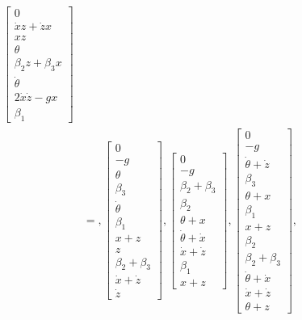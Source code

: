 \documentclass[12pt]{article}
\begin{document}
\begin{align*}
    \left[\begin{matrix}0\\\dot{x} z + \dot{z} x\\x z\\\theta\\\beta_{2} z + \beta_{3} x\\\dot{\theta}\\2 \dot{x} \dot{z} - g x\\\beta_{1}\end{matrix}\right] \\
    &= ,\left[\begin{matrix}0\\- g\\\theta\\\beta_{3}\\\dot{\theta}\\\beta_{1}\\x + z\\z\\\beta_{2} + \beta_{3}\\\dot{x} + \dot{z}\\\dot{z}\end{matrix}\right],
    \left[\begin{matrix}0\\- g\\\beta_{2} + \beta_{3}\\\beta_{2}\\\theta + x\\\dot{\theta} + \dot{x}\\\dot{x} + \dot{z}\\\beta_{1}\\x + z\end{matrix}\right],
    \left[\begin{matrix}0\\- g\\\dot{\theta} + \dot{z}\\\beta_{3}\\\theta + x\\\beta_{1}\\x + z\\\beta_{2}\\\beta_{2} + \beta_{3}\\\dot{\theta} + \dot{x}\\\dot{x} + \dot{z}\\\theta + z\end{matrix}\right],

\end{align*}
\end{document}
